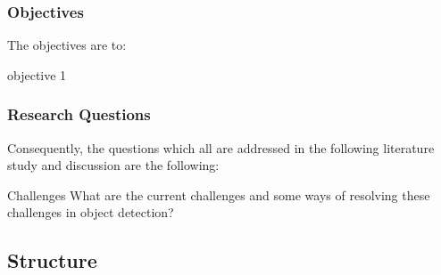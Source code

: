 \subsubsection{Objectives}
\label{sec:primary_objectives}
The objectives are to:
\begin{primaryobjective}
    objective 1
\end{primaryobjective}

\subsubsection{Research Questions}
\label{sec:research_questions}
Consequently, the questions which all are addressed in the following literature study and discussion are the following:

\begin{researchQ}{Challenges}
    What are the current challenges and some ways of resolving these challenges in object detection? 
\end{researchQ}


\subsection{Structure}